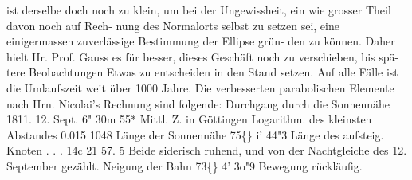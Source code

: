 \documentclass[12pt,a4paper]{article}
\newcommand{\degree}{\textdegree}
\begin{document}
ist  derselbe  doch  noch  zu  klein,  um  bei  der  Ungewissheit,  ein  wie  grosser  Theil  davon  noch  auf  Rech- 
nung des  Normalorts  selbst  zu  setzen  sei,  eine  einigermassen  zuverlässige  Bestimmung  der  Ellipse  grün- 
den zu  können.  Daher  hielt  Hr.  Prof.  Gauss  es  für  besser,  dieses  Geschäft  noch  zu  verschieben,  bis  spä- 
tere Beobachtungen  Etwas  zu  entscheiden  in  den  Stand  setzen.  Auf  alle  Fälle  ist  die  Umlaufszeit  weit 
über  1000  Jahre.     Die  verbesserten  parabolischen  Elemente  nach  Hrn.  Nicolai's  Rechnung  sind  folgende: 
Durchgang  durch  die  Sonnennähe  1811.  12.  Sept. 
6"  30m  55*  Mittl.  Z.  in  Göttingen 
Logarithm.  des  kleinsten  Abstandes     0.015 1048 
Länge  der  Sonnennähe   
75\degree\{\}     i'    44"3 
Länge  des  aufsteig.  Knoten      .     .     .     14c    21     57. 5 
Beide  siderisch  ruhend,    und   von  der   Nachtgleiche 
des  12.  September  gezählt. 
Neigung  der  Bahn   
73\degree\{\}     4'    3o"9 
Bewegung  rückläufig. 


\newpage
\end{document}
